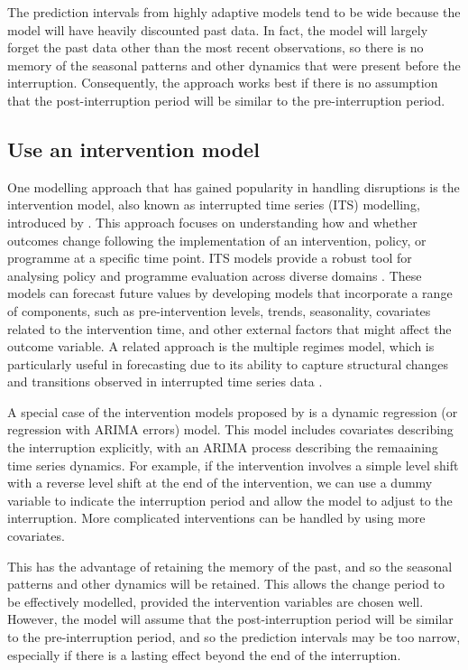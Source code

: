 \documentclass[
  11pt,
  a4paper,
]{article}
\begin{document}
The prediction intervals from highly adaptive models tend to be wide
because the model will have heavily discounted past data. In fact, the
model will largely forget the past data other than the most recent
observations, so there is no memory of the seasonal patterns and other
dynamics that were present before the interruption. Consequently, the
approach works best if there is no assumption that the post-interruption
period will be similar to the pre-interruption period.

\subsection{Use an intervention model}\label{use-an-intervention-model}

One modelling approach that has gained popularity in handling
disruptions is the intervention model, also known as interrupted time
series (ITS) modelling, introduced by \textcite{box1975intervention}.
This approach focuses on understanding how and whether outcomes change
following the implementation of an intervention, policy, or programme at
a specific time point. ITS models provide a robust tool for analysing
policy and programme evaluation across diverse domains
\autocite{bernal2017interrupted,mcdowall2019interrupted}. These models
can forecast future values by developing models that incorporate a range
of components, such as pre-intervention levels, trends, seasonality,
covariates related to the intervention time, and other external factors
that might affect the outcome variable. A related approach is the
multiple regimes model, which is particularly useful in forecasting due
to its ability to capture structural changes and transitions observed in
interrupted time series data \autocite{Koopg2007}.

A special case of the intervention models proposed by
\textcite{box1975intervention} is a dynamic regression (or regression
with ARIMA errors) model. This model includes covariates describing the
interruption explicitly, with an ARIMA process describing the remaaining
time series dynamics. For example, if the intervention involves a simple
level shift with a reverse level shift at the end of the intervention,
we can use a dummy variable to indicate the interruption period and
allow the model to adjust to the interruption. More complicated
interventions can be handled by using more covariates.

This has the advantage of retaining the memory of the past, and so the
seasonal patterns and other dynamics will be retained. This allows the
change period to be effectively modelled, provided the intervention
variables are chosen well. However, the model will assume that the
post-interruption period will be similar to the pre-interruption period,
and so the prediction intervals may be too narrow, especially if there
is a lasting effect beyond the end of the interruption.
\end{document}
